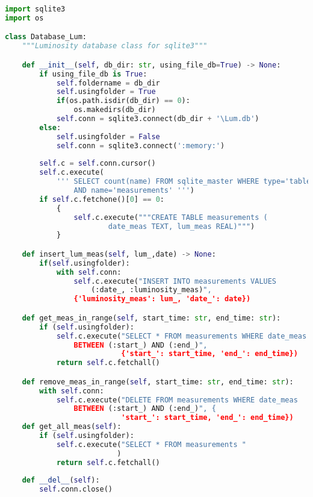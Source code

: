 \begin{lstlisting}[language=Python]
import sqlite3
import os

class Database_Lum:
    """Luminosity database class for sqlite3"""

    def __init__(self, db_dir: str, using_file_db=True) -> None:
        if using_file_db is True:
            self.foldername = db_dir
            self.usingfolder = True
            if(os.path.isdir(db_dir) == 0):
                os.makedirs(db_dir)
            self.conn = sqlite3.connect(db_dir + '\Lum.db')
        else:
            self.usingfolder = False
            self.conn = sqlite3.connect(':memory:')
            
        self.c = self.conn.cursor()
        self.c.execute(
            ''' SELECT count(name) FROM sqlite_master WHERE type='table'
            	AND name='measurements' ''')
        if self.c.fetchone()[0] == 0:
            {                
                self.c.execute("""CREATE TABLE measurements ( 
                        date_meas TEXT, lum_meas REAL)""")
            }

    def insert_lum_meas(self, lum_,date) -> None:
        if(self.usingfolder):
            with self.conn:
                self.c.execute("INSERT INTO measurements VALUES
                	(:date_, :luminosity_meas)", 
                {'luminosity_meas': lum_, 'date_': date})

    def get_meas_in_range(self, start_time: str, end_time: str):
        if (self.usingfolder):
            self.c.execute("SELECT * FROM measurements WHERE date_meas
            	BETWEEN (:start_) AND (:end_)",
                           {'start_': start_time, 'end_': end_time})
            return self.c.fetchall()

    def remove_meas_in_range(self, start_time: str, end_time: str):
        with self.conn:
            self.c.execute("DELETE FROM measurements WHERE date_meas
            	BETWEEN (:start_) AND (:end_)", {
                           'start_': start_time, 'end_': end_time})
    def get_all_meas(self):
        if (self.usingfolder):
            self.c.execute("SELECT * FROM measurements "
                          )
            return self.c.fetchall()
            
    def __del__(self):
        self.conn.close()
\end{lstlisting}


